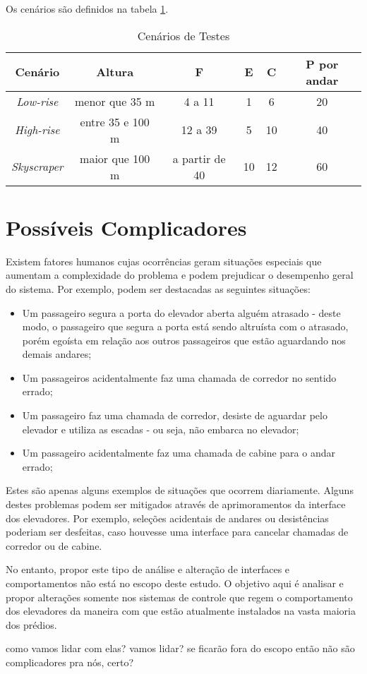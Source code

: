 Os cenários são definidos na tabela \ref{tab:cenarios}.

\begin{table}[htb!]
\centering
\caption{Cenários de Testes}
\label{tab:cenarios}
\begin{tabular}{|c|c|c|c|c|c|}
\hline
{\bf Cenário} & {\bf Altura} & {\bf F}  & {\bf E} & {\bf C} & {\bf P por andar}
\\ \hline
{\it Low-rise}   & menor que 35 m    & 4 a 11         & 1  & 6  & 20 \\ \hline
{\it High-rise}  & entre 35 e 100 m  & 12 a 39        & 5  & 10 & 40 \\ \hline
{\it Skyscraper} & maior que 100 m   & a partir de 40 & 10 & 12 & 60 \\ \hline
\end{tabular}
\end{table}

\section{\label{section:difficulties}Possíveis Complicadores}

Existem fatores humanos cujas ocorrências geram situações especiais que aumentam
a complexidade do problema e podem prejudicar o desempenho geral do sistema. Por
exemplo, podem ser destacadas as seguintes situações:

\begin{itemize}
  \item Um passageiro segura a porta do elevador aberta alguém atrasado - deste
        modo, o passageiro que segura a porta está sendo altruísta com o
        atrasado, porém egoísta em relação aos outros passageiros que estão
        aguardando nos demais andares;
  \item Um passageiros acidentalmente faz uma chamada de corredor no sentido
        errado;
  \item Um passageiro faz uma chamada de corredor, desiste de aguardar pelo
        elevador e utiliza as escadas - ou seja, não embarca no elevador;
  \item Um passageiro acidentalmente faz uma chamada de cabine para o andar
        errado;
\end{itemize}

Estes são apenas alguns exemplos de situações que ocorrem diariamente. Alguns
destes problemas podem ser mitigados através de aprimoramentos da interface dos
elevadores. Por exemplo, seleções acidentais de andares ou desistências poderiam
ser desfeitas, caso houvesse uma interface para cancelar chamadas de corredor ou
de cabine.

No entanto, propor este tipo de análise e alteração de interfaces e
comportamentos não está no escopo deste estudo. O objetivo aqui é analisar e
propor alterações somente nos sistemas de controle que regem o comportamento dos
elevadores da maneira com que estão atualmente instalados na vasta maioria dos
prédios.

{\color{red}como vamos lidar com elas? vamos lidar? se ficarão fora do escopo
então não são complicadores pra nós, certo?}
